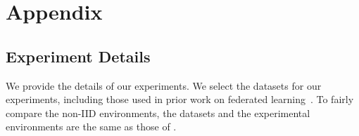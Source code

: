 \documentclass{article} %
\begin{document}

\clearpage







\clearpage

\appendix
\section{Appendix}
\subsection{Experiment Details}
We provide the details of our experiments. We select the datasets for our experiments, including those used in prior work on federated learning~\citep{McMahan2017communication,Li2020federated,Acar2021federated}. To fairly compare the non-IID environments, the datasets and the experimental environments are the same as those of \citet{Acar2021federated}.
\end{document}
